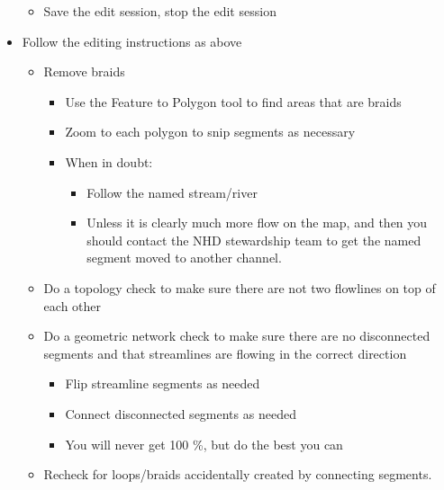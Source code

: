 \documentclass[letterpaper,10pt,english]{sphinxmanual}
\begin{document}
\begin{itemize}
\begin{itemize}
\begin{itemize}
\end{itemize}

\item {} 
Save the edit session, stop the edit session

\end{itemize}

\item {} 
Follow the editing instructions as above
\begin{itemize}
\item {} 
Remove braids
\begin{itemize}
\item {} 
Use the Feature to Polygon tool to find areas that are braids

\item {} 
Zoom to each polygon to snip segments as necessary

\item {} 
When in doubt:
\begin{itemize}
\item {} 
Follow the named stream/river

\item {} 
Unless it is clearly much more flow on the map, and then you should contact the NHD stewardship team to get the named segment moved to another channel.

\end{itemize}

\end{itemize}

\item {} 
Do a topology check to make sure there are not two flowlines on top of each other

\item {} 
Do a geometric network check to make sure there are no disconnected segments and that streamlines are flowing in the correct direction
\begin{itemize}
\item {} 
Flip streamline segments as needed

\item {} 
Connect disconnected segments as needed

\item {} 
You will never get 100 \%, but do the best you can

\end{itemize}

\item {} 
Recheck for loops/braids accidentally created by connecting segments.

\end{itemize}

\end{itemize}
\end{document}
